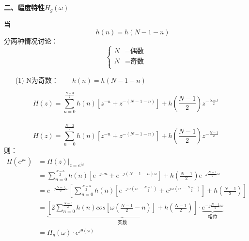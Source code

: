 \documentclass[notheorems,compress,mathserif,table]{beamer}
\begin{document}
\begin{frame}[allowframebreaks]\frametitle{}%
     \textbf{二、幅度特性$H_g(\omega)$}
      \par 当
      $$\quad\quad  h(n) = h(N-1-n)$$
          分两种情况讨论：
          $$
            \left\{ \begin{aligned}
                N  &=  \mbox{偶数}\\
                N  &=  \mbox{奇数}\\
            \end{aligned} \right.
      $$
      \begin{enumerate}
        \item  [(1)] N为奇数：$\quad\quad h(n) = h(N-1-n)$
      \end{enumerate}

            $$H(z) = \sum_{n=0}^{\frac{N-3}{2}}h(n)\left[ z^{-n}+z^{-(N-1-n)}\right]+h\left(\frac{N-1}{2}\right)z^{-\frac{N-1}{2}}$$
\end{frame}



\begin{frame}[shrink]\frametitle{}%
$$H(z) = \sum_{n=0}^{\frac{N-3}{2}}h(n)\left[ z^{-n}+z^{-(N-1-n)}\right]+h(\frac{N-1}{2})z^{-\frac{N-1}{2}}$$
则：
\begin{equation*}
\begin{split}
H(e^{j\omega})  &= H(z)|_{z=e^{j\omega}}\\
    &= \sum_{n=0}^{\frac{N-3}{2}}h(n)\left[
       e^{-j\omega n}+e^{-j(N-1-n)\omega}\right]+ h(\frac{N-1}{2})e^{-j\frac{N-1}{2}\omega}\\
    &= e^{-j\frac{N-1}{2}\omega}
       \left[\sum_{n=0}^{\frac{N-3}{2}}h(n)\left[e^{-j\omega(n-\frac{N-1}{2})}+e^{j\omega(n-\frac{N-1}{2})}\right]+ h(\frac{N-1}{2})\right]\\
    &=\underbrace{\left[2\sum_{n=0}^{\frac{N-3}{2}}h(n)cos[\omega
       (\frac{N-1}{2}-n)]+h(\frac{N-1}{2})\right]}_{\mbox{实数}}
       \cdot\underbrace{e^{-j\frac{N-1}{2}\omega}}_{\mbox{相位}}\\
    &= H_g(\omega)\cdot e^{j\theta(\omega)}\\
\end{split}
\end{equation*}
\end{frame}
\end{document}
